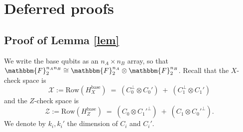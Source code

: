 \documentclass[a4paper,onecolumn,11pt]{quantumarticle}
\def\F{\mathbbm{F}}
\def\Row{\text{Row}}
\begin{document}
\section{Deferred proofs}
\label{app}




\subsection{Proof of Lemma \ref{lem}}



We write the base qubits as an $n_A\times n_B$ array, so that $\F_2^{n_A n_B}\cong \F_2^{n_A}\otimes \F_2^{n_B}$.
Recall that the $X$-check space is
\[
\mathcal X := \Row(H_X^{\mathrm{base}}) \;=\; (C_0^\perp\otimes C_0') \;+\; (C_1^\perp\otimes C_1')
\]
and the $Z$-check space is
\[
\mathcal Z := \Row(H_Z^{\mathrm{base}}) \;=\; (C_0\otimes C_1'^\perp) \;+\; (C_1\otimes C_0'^\perp).
\]
We denote by $k_i, k_i'$ the dimension of $C_i$ and $C_i'$. 
\end{document}
